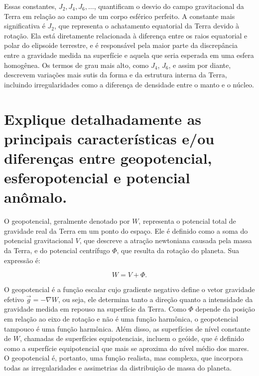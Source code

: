 Essas constantes, \( J_2, J_4, J_6, \ldots \), quantificam o desvio do campo gravitacional da Terra em relação ao campo de um corpo esférico perfeito. A constante mais significativa é \( J_2 \), que representa o achatamento equatorial da Terra devido à rotação. Ela está diretamente relacionada à diferença entre os raios equatorial e polar do elipsoide terrestre, e é responsável pela maior parte da discrepância entre a gravidade medida na superfície e aquela que seria esperada em uma esfera homogênea. Os termos de grau mais alto, como \( J_4 \), \( J_6 \), e assim por diante, descrevem variações mais sutis da forma e da estrutura interna da Terra, incluindo irregularidades como a diferença de densidade entre o manto e o núcleo.


\section{Explique detalhadamente as principais características e/ou diferenças entre geopotencial, esferopotencial e potencial anômalo.}

O geopotencial, geralmente denotado por \( W \), representa o potencial total de gravidade real da Terra em um ponto do espaço. Ele é definido como a soma do potencial gravitacional \( V \), que descreve a atração newtoniana causada pela massa da Terra, e do potencial centrífugo \( \Phi \), que resulta da rotação do planeta. Sua expressão é:

\[
W = V + \Phi \text{.}
\]

\noindent
O geopotencial é a função escalar cujo gradiente negativo define o vetor gravidade efetivo \( \vec{g} = -\nabla W \), ou seja, ele determina tanto a direção quanto a intensidade da gravidade medida em repouso na superfície da Terra. Como \( \Phi \) depende da posição em relação ao eixo de rotação e não é uma função harmônica, o geopotencial tampouco é uma função harmônica. Além disso, as superfícies de nível constante de \( W \), chamadas de superfícies equipotenciais, incluem o geóide, que é definido como a superfície equipotencial que mais se aproxima do nível médio dos mares. O geopotencial é, portanto, uma função realista, mas complexa, que incorpora todas as irregularidades e assimetrias da distribuição de massa do planeta.

